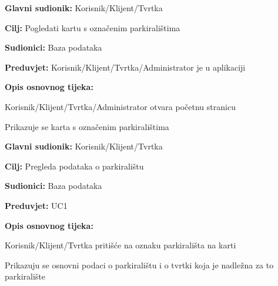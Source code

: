 \noindent {}
\begin{packed_item}
	
	\item \textbf{Glavni sudionik: } Korisnik/Klijent/Tvrtka
	\item \textbf{Cilj:} Pogledati kartu s označenim parkiralištima
	\item \textbf{Sudionici:} Baza podataka
	\item \textbf{Preduvjet:} Korisnik/Klijent/Tvrtka/Administrator je u aplikaciji
	\item \textbf{Opis osnovnog tijeka:}
	
	\item[] \begin{packed_enum}
		
		\item Korisnik/Klijent/Tvrtka/Administrator otvara početnu stranicu
		\item Prikazuje se karta s označenim parkiralištima

	\end{packed_enum}
	
\end{packed_item}

\noindent {}
\begin{packed_item}
	
	\item \textbf{Glavni sudionik:} Korisnik/Klijent/Tvrtka
	\item \textbf{Cilj:} Pregleda podataka o parkiralištu
	\item \textbf{Sudionici:} Baza podataka
	\item \textbf{Preduvjet:} UC1
	\item \textbf{Opis osnovnog tijeka:}
	
	\item[] \begin{packed_enum}
		
		\item Korisnik/Klijent/Tvrtka pritišće na oznaku parkirališta na karti
		\item Prikazuju se osnovni podaci o parkiralištu i o tvrtki koja je nadležna za to parkiralište

	\end{packed_enum}
\end{packed_item}

\pagebreak

